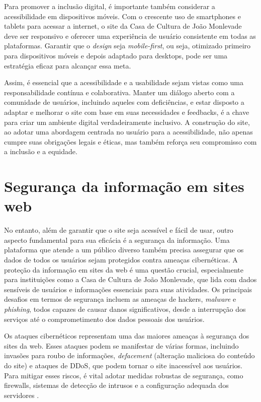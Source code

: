 Para promover a inclusão digital, é importante também considerar a acessibilidade em dispositivos móveis. Com o crescente uso de smartphones e tablets para acessar a internet, o site da Casa de Cultura de João Monlevade deve ser responsivo e oferecer uma experiência de usuário consistente em todas as plataformas. Garantir que o \textit{design} seja \textit{mobile-first}, ou seja, otimizado primeiro para dispositivos móveis e depois adaptado para desktops, pode ser uma estratégia eficaz para alcançar essa meta.

Assim, é essencial que a acessibilidade e a usabilidade sejam vistas como uma responsabilidade contínua e colaborativa. Manter um diálogo aberto com a comunidade de usuários, incluindo aqueles com deficiências, e estar disposto a adaptar e melhorar o site com base em suas necessidades e feedbacks, é a chave para criar um ambiente digital verdadeiramente inclusivo. A construção do site, ao adotar uma abordagem centrada no usuário para a acessibilidade, não apenas cumpre suas obrigações legais e éticas, mas também reforça seu compromisso com a inclusão e a equidade.


\section{Segurança da informação em sites web}

No entanto, além de garantir que o site seja acessível e fácil de usar, outro aspecto fundamental para sua eficácia é a segurança da informação. Uma plataforma que atende a um público diverso também precisa assegurar que os dados de todos os usuários sejam protegidos contra ameaças cibernéticas. A proteção da informação em sites da web é uma questão crucial, especialmente para instituições como a Casa de Cultura de João Monlevade, que lida com dados sensíveis de usuários e informações essenciais para suas atividades. Os principais desafios em termos de segurança incluem as ameaças de hackers, \textit{malware} e \textit{phishing}, todos capazes de causar danos significativos, desde a interrupção dos serviços até o comprometimento dos dados pessoais dos usuários.

Os ataques cibernéticos representam uma das maiores ameaças à segurança dos sites da web. Esses ataques podem se manifestar de várias formas, incluindo invasões para roubo de informações, \textit{defacement} (alteração maliciosa do conteúdo do site) e ataques de \ac{DDoS}, que podem tornar o site inacessível aos usuários. Para mitigar esses riscos, é vital adotar medidas robustas de segurança, como firewalls, sistemas de detecção de intrusos e a configuração adequada dos servidores \cite{li2021comprehensive}.

